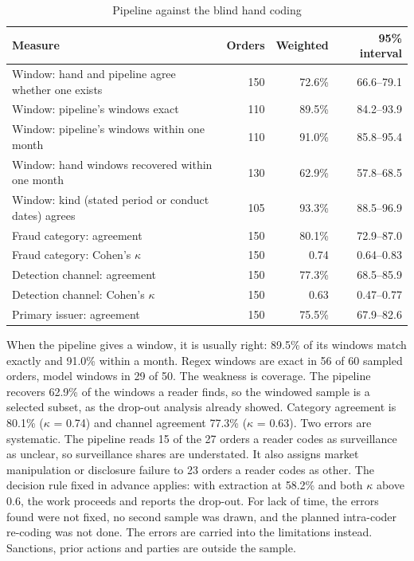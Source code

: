 \documentclass[letterpaper,11pt,leqno]{article}
\begin{document}
\begin{table}[htb]
\caption{Pipeline against the blind hand coding}
\begin{tabular*}{\textwidth}[]{l@{\extracolsep\fill}rrr}
\toprule
Measure & Orders & Weighted & 95\% interval \\
\midrule
Window: hand and pipeline agree whether one exists & 150 & 72.6\% & 66.6--79.1 \\
Window: pipeline's windows exact & 110 & 89.5\% & 84.2--93.9 \\
Window: pipeline's windows within one month & 110 & 91.0\% & 85.8--95.4 \\
Window: hand windows recovered within one month & 130 & 62.9\% & 57.8--68.5 \\
Window: kind (stated period or conduct dates) agrees & 105 & 93.3\% & 88.5--96.9 \\
Fraud category: agreement & 150 & 80.1\% & 72.9--87.0 \\
Fraud category: Cohen's $\kappa$ & 150 & 0.74 & 0.64--0.83 \\
Detection channel: agreement & 150 & 77.3\% & 68.5--85.9 \\
Detection channel: Cohen's $\kappa$ & 150 & 0.63 & 0.47--0.77 \\
Primary issuer: agreement & 150 & 75.5\% & 67.9--82.6 \\
\bottomrule
\end{tabular*}
\label{t:valresults}\end{table}

When the pipeline gives a window, it is usually right: 89.5\% of its windows match exactly and 91.0\% within a month. Regex windows are exact in 56 of 60 sampled orders, model windows in 29 of 50. The weakness is coverage. The pipeline recovers 62.9\% of the windows a reader finds, so the windowed sample is a selected subset, as the drop-out analysis already showed. Category agreement is 80.1\% ($\kappa$ = 0.74) and channel agreement 77.3\% ($\kappa$ = 0.63). Two errors are systematic. The pipeline reads 15 of the 27 orders a reader codes as surveillance as unclear, so surveillance shares are understated. It also assigns market manipulation or disclosure failure to 23 orders a reader codes as other. The decision rule fixed in advance applies: with extraction at 58.2\% and both $\kappa$ above 0.6, the work proceeds and reports the drop-out. For lack of time, the errors found were not fixed, no second sample was drawn, and the planned intra-coder re-coding was not done. The errors are carried into the limitations instead. Sanctions, prior actions and parties are outside the sample.
\end{document}
